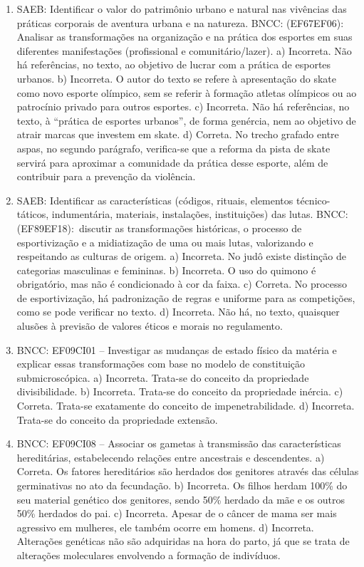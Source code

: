 \begin{enumerate}
\item
SAEB: Identificar o valor do patrimônio urbano e natural nas vivências
das práticas corporais de aventura urbana e na natureza. BNCC: (EF67EF06): Analisar as transformações na organização e na prática dos esportes em suas diferentes manifestações (profissional e comunitário/lazer). a) Incorreta. Não há referências, no texto, ao objetivo de lucrar com a prática de esportes urbanos. b) Incorreta. O autor do texto se refere à apresentação do skate como novo esporte olímpico, sem se referir à formação atletas olímpicos ou ao patrocínio privado para outros esportes. c) Incorreta. Não há referências, no texto, à ``prática de esportes urbanos'', de forma genércia, nem ao objetivo de atrair marcas que investem em skate. d) Correta. No trecho grafado entre aspas, no segundo parágrafo, verifica-se que a reforma da pista de skate servirá para aproximar a comunidade da prática desse esporte, além de contribuir para a prevenção da violência.

\item
SAEB: Identificar as características (códigos, rituais, elementos técnico-táticos, indumentária, materiais, instalações, instituições) das lutas. BNCC: (EF89EF18):~discutir as transformações históricas, o processo de esportivização e a midiatização de uma ou mais lutas, valorizando e respeitando as culturas de origem. a) Incorreta. No judô existe distinção de categorias masculinas e femininas. b) Incorreta. O uso do quimono é obrigatório, mas não é condicionado à cor da faixa. c) Correta. No processo de esportivização, há padronização de regras e uniforme para as competições, como se pode verificar no texto. d) Incorreta. Não há, no texto, quaisquer alusões à previsão de valores éticos e morais no regulamento.

\item
BNCC: EF09CI01 -- Investigar as mudanças de estado
físico da matéria e explicar essas transformações com base no modelo de
constituição submicroscópica.
a)  Incorreta. Trata-se do conceito da propriedade divisibilidade.
b)  Incorreta. Trata-se do conceito da propriedade inércia.
c)  Correta. Trata-se exatamente do conceito de impenetrabilidade.
d)  Incorreta. Trata-se do conceito da propriedade extensão.

\item
BNCC: EF09CI08 -- Associar os gametas à transmissão
das características hereditárias, estabelecendo relações entre
ancestrais e descendentes.
a)  Correta. Os fatores hereditários são herdados dos genitores
  através das células germinativas no ato da fecundação.
b)  Incorreta. Os filhos herdam 100\% do seu material genético dos
  genitores, sendo 50\% herdado da mãe e os outros 50\% herdados do pai.
c)  Incorreta. Apesar de o câncer de mama ser mais agressivo em
  mulheres, ele também ocorre em homens.
d)  Incorreta. Alterações genéticas não são adquiridas na hora do
  parto, já que se trata de alterações moleculares envolvendo a formação de indivíduos.


\end{enumerate}
